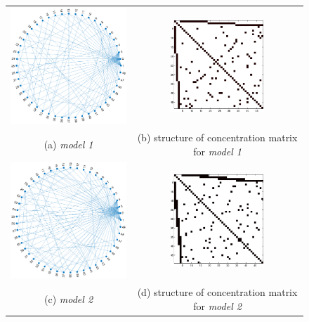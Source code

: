 \documentclass{article}
\begin{document}
\begin{figure}
\label{fig:synth}
\center
\begin{tabular}{cc}
      \includegraphics[width=6cm]{fig/disjoint_graph} 
  &   \includegraphics[width=3.5cm]{fig/disjoint_true}
   \\    (a) \textit{model 1} & (b)  structure of concentration matrix for \textit{model 1} \\
      \includegraphics[width=6cm]{fig/over_graph} 
  &   \includegraphics[width=3.5cm]{fig/overlap_true}
   \\    (c) \textit{model 2} & (d)  structure of concentration matrix for \textit{model 2} \\

\end{tabular}
\end{figure}
\end{document}
